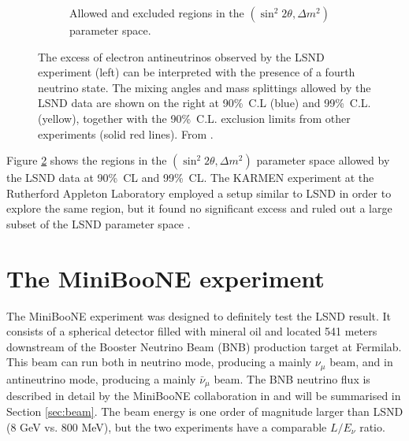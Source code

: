 \begin{figure}[htbp]
\begin{subfigure}{0.48\textwidth}
\begin{center}
        \caption{Allowed and excluded regions in the $(\sin^2 2\theta, \Delta m^2)$ parameter space.}\label{fig:lsnd_space}
    \end{center}
  \end{subfigure}
    \caption{The excess of electron antineutrinos observed by the LSND experiment (left) can be interpreted with the presence of a fourth neutrino state. The mixing angles and mass splittings allowed by the LSND data are shown on the right at 90\%~C.L (blue) and 99\%~C.L. (yellow), together with the 90\%~C.L. exclusion limits from other experiments (solid red lines). From \cite{Aguilar:2001ty}.}
\end{figure}

Figure \ref{fig:lsnd_space} shows the regions in the $(\sin^2 2\theta, \Delta m^2)$ parameter space allowed by the LSND data at 90\%~CL and 99\%~CL. %
The KARMEN experiment at the Rutherford Appleton Laboratory employed a setup similar to LSND in order to explore the same region, but it found no significant excess and ruled out a large subset of the LSND parameter space \cite{Eitel:2000by}. 

\section{The MiniBooNE experiment}\label{sec:miniboone}
The MiniBooNE experiment was designed to definitely test the LSND result. It consists of a spherical detector filled with mineral oil and located 541 meters downstream of the Booster Neutrino Beam (BNB) production target at Fermilab. This beam can run both in neutrino mode, producing a mainly $\nu_{\mu}$ beam, and in antineutrino mode, producing a mainly $\bar{\nu}_{\mu}$ beam. The BNB neutrino flux is described in detail by the MiniBooNE collaboration in \cite{AguilarArevalo:2008yp} and will be summarised in Section \ref{sec:beam}. The beam energy is one order of magnitude larger than LSND (8 GeV vs. 800 MeV), but the two experiments have a comparable $L/E_{\nu}$ ratio.

